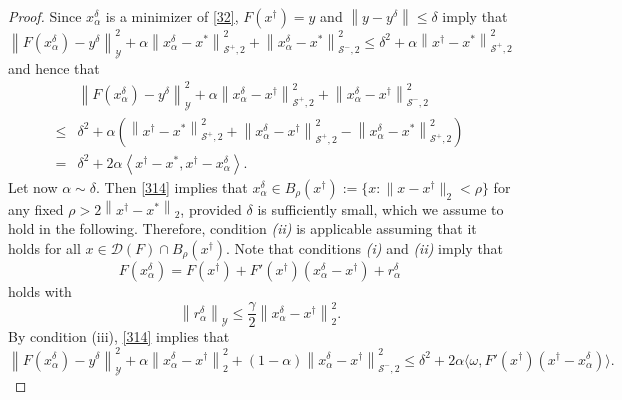 \documentclass[11pt]{article}
\begin{document}
\begin{proof}
Since $ x^\delta_\alpha $ is a minimizer of \eqref{32}, $ F(x^\dagger) = y $ and $ \left\|y-y^\delta\right\|\leq\delta $ imply that
\begin{displaymath}
\left\|F(x_{\alpha}^{\delta}) - y^\delta\right\|^2_\mathcal{Y} + \alpha\left\|x_{\alpha}^{\delta} - x^*\right\|_{\mathcal{S}^+, 2}^2 + \left\|x_{\alpha}^{\delta} - x^*\right\|_{\mathcal{S}^-, 2}^2
\leq 
\delta^2 + \alpha\left\|x^\dagger - x^*\right\|_{\mathcal{S}^+, 2}^2
\end{displaymath}
and hence that
\begin{equation}\label{314}
\begin{aligned}
&\left\|F(x_{\alpha}^{\delta}) - y^\delta\right\|^2_\mathcal{Y} + \alpha\left\|x_{\alpha}^{\delta} - x^\dagger\right\|_{\mathcal{S}^+, 2}^2 + \left\|x_{\alpha}^{\delta} - x^\dagger\right\|_{\mathcal{S}^-, 2}^2\\
\leq 
&\delta^2 + \alpha\left(\left\|x^\dagger - x^*\right\|_{\mathcal{S}^+, 2}^2 + \left\|x_{\alpha}^{\delta} - x^\dagger\right\|_{\mathcal{S}^+, 2}^2 - \left\|x_{\alpha}^{\delta} - x^*\right\|_{\mathcal{S}^+, 2}^2\right)\\
=
&\delta^2 + 2\alpha\left\langle x^\dagger - x^*, x^\dagger - x_{\alpha}^{\delta}\right\rangle.
\end{aligned}
\end{equation}
Let now $ \alpha\sim\delta $. Then \eqref{314} implies that $ x^\delta_\alpha\in B_\rho(x^\dagger) := \{x: \|x-x^\dagger\|_2<\rho\} $ for any fixed $ \rho > 2\left\|x^\dagger - x^*\right\|_2 $, provided $\delta$ is sufficiently small, which we assume to hold in the following. Therefore, condition \textit{(ii)} is applicable assuming that it holds for all $ x\in \mathcal{D}(F)\cap B_\rho(x^\dagger) $. Note that conditions \textit{(i)} and \textit{(ii)} imply that
\begin{equation}\label{315}
F(x^\delta_\alpha) = F(x^\dagger) + F'(x^\dagger)(x^\delta_\alpha - x^\dagger) + r^\delta_\alpha
\end{equation}
holds with
\begin{equation}\label{316}
\left\|r^\delta_\alpha\right\|_\mathcal{Y} \leq \dfrac{\gamma}{2}\left\|x^\delta_\alpha - x^\dagger\right\|_2^2.
\end{equation}
By condition (iii), \eqref{314} implies that
\begin{equation}\label{317}
\left\|F(x_{\alpha}^{\delta}) - y^\delta\right\|^2_\mathcal{Y} + \alpha\left\|x_{\alpha}^{\delta} - x^\dagger\right\|_2^2 + (1-\alpha)\left\|x_{\alpha}^{\delta} - x^\dagger\right\|_{\mathcal{S}^-, 2}^2\leq \delta^2 + 2\alpha\langle \omega, F'(x^\dagger)(x^\dagger - x_{\alpha}^{\delta})\rangle.

\end{equation}
\end{proof}
\end{document}
